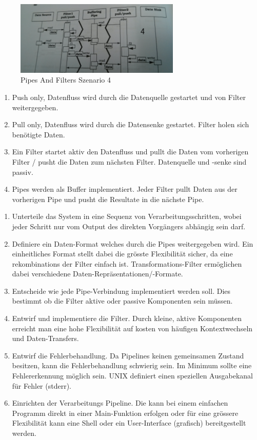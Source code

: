 \begin{figure}[H]
	\centering
	\includegraphics[width=0.7\textwidth]{content/posa1/images/pipes-and-filters-szen4.png}
	\caption{Pipes And Filters Szenario 4}
\end{figure}


\begin{enumerate}
	\item Push only, Datenfluss wird durch die Datenquelle gestartet und von Filter weitergegeben.
	\item Pull only, Datenfluss wird durch die Datensenke gestartet. Filter holen sich benötigte Daten.
	\item Ein Filter startet aktiv den Datenfluss und pullt die Daten vom vorherigen Filter / pusht die Daten zum nächsten Filter. Datenquelle und -senke sind passiv.
	\item Pipes werden als Buffer implementiert. Jeder Filter pullt Daten aus der vorherigen Pipe und pusht die Resultate in die nächste Pipe.
\end{enumerate}


\begin{enumerate}
	\item Unterteile das System in eine Sequenz von Verarbeitungsschritten, wobei jeder Schritt nur vom Output des direkten Vorgängers abhängig sein darf.
	\item Definiere ein Daten-Format welches durch die Pipes weitergegeben wird. Ein einheitliches Format stellt dabei die grösste Flexibilität sicher, da eine rekombinations der Filter einfach ist. Transformations-Filter ermöglichen dabei verschiedene Daten-Repräsentationen/-Formate.
	\item Entscheide wie jede Pipe-Verbindung implementiert werden soll. Dies bestimmt ob die Filter aktive oder passive Komponenten sein müssen.
	\item Entwirf und implementiere die Filter. Durch kleine, aktive Komponenten erreicht man eine hohe Flexibilität auf kosten von häufigen Kontextwechseln und Daten-Transfers.
	\item Entwirf die Fehlerbehandlung. Da Pipelines keinen gemeinsamen Zustand besitzen, kann die Fehlerbehandlung schwierig sein. Im Minimum sollte eine Fehlererkennung möglich sein. UNIX definiert einen speziellen Ausgabekanal für Fehler (stderr).
	\item Einrichten der Verarbeitungs Pipeline. Die kann bei einem einfachen Programm direkt in einer Main-Funktion erfolgen oder für eine grössere Flexibilität kann eine Shell oder ein User-Interface (grafisch) bereitgestellt werden.
\end{enumerate}


